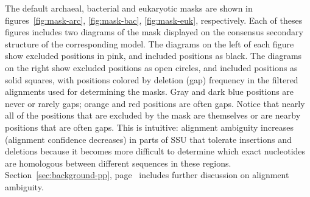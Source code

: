 The default archaeal, bacterial and eukaryotic masks are shown in
figures~\ref{fig:mask-arc}, \ref{fig:mask-bac}, \ref{fig:mask-euk},
respectively. Each of theses figures includes two diagrams of the mask
displayed on the consensus secondary structure of the corresponding
model. The diagrams on the left of each figure show excluded positions
in pink, and included positions as black. The diagrams on the right
show excluded positions as open circles, and included positions as
solid squares, with positions colored by deletion (gap) frequency in
the filtered alignments used for determining the masks. Gray and dark
blue positions are never or rarely gaps; orange and red positions are
often gaps. Notice that nearly all of the positions that are excluded
by the mask are themselves or are nearby positions that are often
gaps. This is intuitive: alignment ambiguity increases (alignment
confidence decreases) in parts of SSU that tolerate insertions and
deletions because it becomes more difficult to determine which
exact nucleotides are homologous between different sequences in these
regions. Section~\ref{sec:background-pp},
page~\pageref{sec:background-pp} includes further discussion on
alignment ambiguity.

